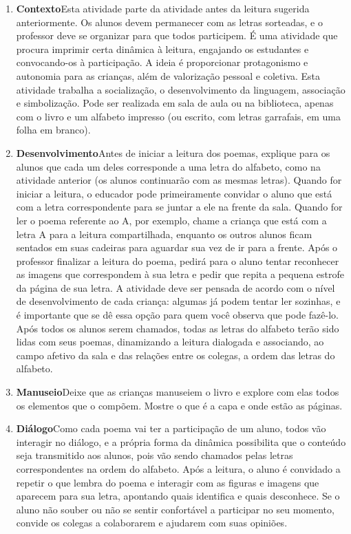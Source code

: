\documentclass[11pt]{extarticle}
\begin{document}
\begin{enumerate}
\item \textbf{Contexto}\quad Esta atividade parte da atividade antes da leitura sugerida anteriormente. Os alunos devem permanecer com as letras sorteadas, e o professor deve se organizar para que todos participem. É uma atividade que procura imprimir certa dinâmica à leitura, engajando os estudantes e convocando-os à participação. A ideia é proporcionar protagonismo e autonomia para as crianças, além de valorização pessoal e coletiva. Esta atividade trabalha a socialização, o desenvolvimento da linguagem, associação e simbolização. Pode ser realizada em sala de aula ou na biblioteca, apenas com o livro e um alfabeto impresso (ou escrito, com letras garrafais, em uma folha em branco).  


\item \textbf{Desenvolvimento}\quad Antes de iniciar a leitura dos poemas, explique para os alunos que cada um deles corresponde a uma letra do alfabeto, como na atividade anterior (os alunos continuarão com as mesmas letras). Quando for iniciar a leitura, o educador pode primeiramente convidar o aluno  que está com a letra correspondente para se juntar a ele na frente da sala. Quando for ler o poema referente ao A, por exemplo, chame a criança que está com a letra A para a leitura compartilhada, enquanto os outros alunos ficam sentados em suas cadeiras para aguardar sua vez de ir para a frente. Após o professor finalizar a leitura do poema, pedirá para o aluno tentar reconhecer as imagens que correspondem à sua letra e pedir que repita a pequena estrofe da página de sua letra. A atividade deve ser pensada de acordo com o nível de desenvolvimento de cada criança: algumas já podem tentar ler sozinhas, e é importante que se dê essa opção para quem você observa que pode fazê-lo. Após todos os alunos serem chamados, todas as letras do alfabeto terão sido lidas com seus poemas, dinamizando a leitura dialogada e associando, ao campo afetivo da sala e das relações entre os colegas, a ordem das letras do alfabeto.
 
\item \textbf{Manuseio}\quad Deixe que as crianças manuseiem o livro 
e explore com elas todos os elementos que o compõem. Mostre o que é a 
capa e onde estão as páginas.

\item \textbf{Diálogo}\quad Como cada poema vai ter a participação de um aluno, todos vão interagir no diálogo, e a própria forma da dinâmica possibilita que o conteúdo seja transmitido aos alunos, pois vão sendo chamados pelas letras correspondentes na ordem do alfabeto. Após a leitura, o aluno é convidado a repetir o que lembra do poema e interagir com as figuras e imagens que aparecem para sua letra, apontando quais identifica e quais desconhece. Se o aluno não souber ou não se sentir confortável a participar no seu momento, convide os colegas a colaborarem e ajudarem com suas opiniões.


\end{enumerate}
\end{document}
